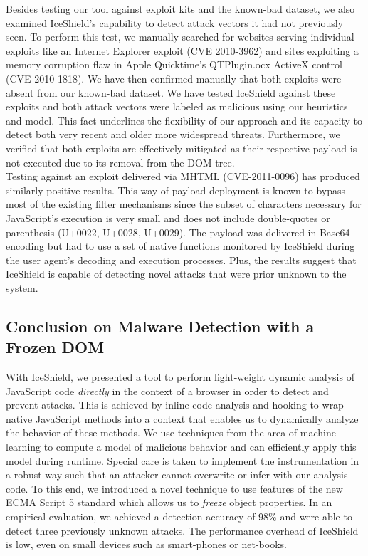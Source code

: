     Besides testing our tool against exploit kits and the known-bad dataset, we also examined IceShield's capability to detect attack vectors it had not previously seen. To perform this test, we manually searched for websites serving individual exploits like an Internet Explorer exploit (CVE 2010-3962) and sites exploiting a memory corruption flaw in Apple Quicktime's QTPlugin.ocx ActiveX control (CVE 2010-1818). We have then confirmed manually that both exploits were absent from our known-bad dataset. 
    We have tested IceShield against these exploits and both attack vectors were labeled as malicious using our heuristics and model. This fact underlines the flexibility of our approach and its capacity to detect both very recent and older more widespread threats. Furthermore, we verified that both exploits are effectively mitigated as their respective payload is not executed due to its removal from the DOM tree. \\

    Testing against an exploit delivered via MHTML (CVE-2011-0096) has produced similarly positive results. This way of payload deployment is known to bypass most of the existing filter mechanisms since the subset of characters necessary for JavaScript's execution is very small and does not include double-quotes or parenthesis (U+0022, U+0028, U+0029). The payload was delivered in Base64 encoding but had to use a set of native functions monitored by IceShield during the user agent's decoding and execution processes. Plus, the results suggest that IceShield is capable of detecting novel attacks that were prior unknown to the system. \\

    \subsection{Conclusion on Malware Detection with a Frozen DOM}
    \label{subsubsec:6.5.3.conclusion}

    With IceShield, we presented a tool to perform light-weight dynamic analysis of JavaScript code \textit{directly} in the context of a browser in order to detect and prevent attacks. This is achieved by inline code analysis and hooking to wrap native JavaScript methods into a context that enables us to dynamically analyze the behavior of these methods. We use techniques from the area of machine learning to compute a model of malicious behavior and can efficiently apply this model during runtime. Special care is taken to implement the instrumentation in a robust way such that an attacker cannot overwrite or infer with our analysis code. To this end, we introduced a novel technique to use features of the new ECMA Script 5 standard which allows us to \textit{freeze} object properties. In an empirical evaluation, we achieved a detection accuracy of 98\% and were able to detect three previously unknown attacks. The performance overhead of IceShield is low, even on small devices such as smart-phones or net-books.

